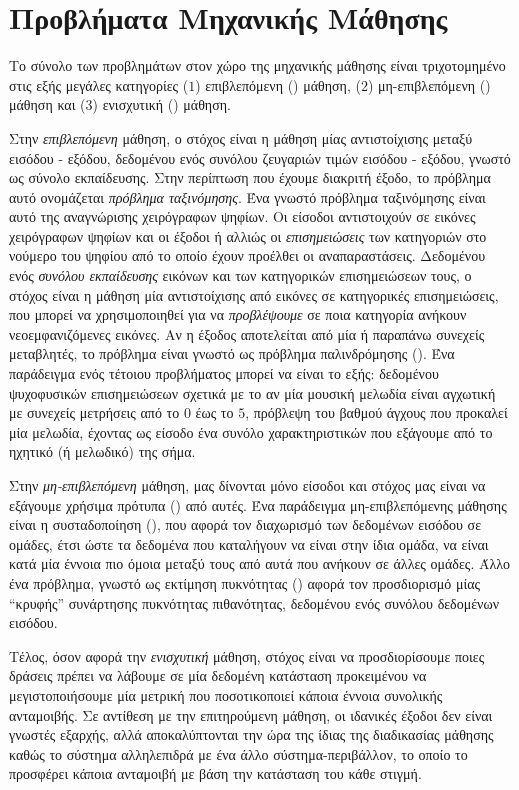 \section{Προβλήματα Μηχανικής Μάθησης}
Το σύνολο των προβλημάτων στον χώρο της μηχανικής μάθησης είναι τριχοτομημένο στις εξής μεγάλες κατηγορίες ($1$) επιβλεπόμενη () μάθηση, ($2$) μη-επιβλεπόμενη () μάθηση και ($3$) ενισχυτική () μάθηση.\par
Στην \textit{επιβλεπόμενη} μάθηση, ο στόχος είναι η μάθηση μίας αντιστοίχισης μεταξύ εισόδου - εξόδου, δεδομένου ενός συνόλου ζευγαριών τιμών εισόδου - εξόδου, γνωστό ως σύνολο εκπαίδευσης.
Στην περίπτωση που έχουμε διακριτή έξοδο, το πρόβλημα αυτό ονομάζεται \textit{πρόβλημα ταξινόμησης}.
Ένα γνωστό πρόβλημα ταξινόμησης είναι αυτό της αναγνώρισης χειρόγραφων ψηφίων.
Οι είσοδοι αντιστοιχούν σε εικόνες χειρόγραφων ψηφίων και οι έξοδοι ή αλλιώς οι \textit{επισημειώσεις} των κατηγοριών στο νούμερο του ψηφίου από το οποίο έχουν προέλθει οι αναπαραστάσεις.
Δεδομένου ενός \textit{συνόλου εκπαίδευσης} εικόνων και των κατηγορικών επισημειώσεων τους, ο στόχος είναι η μάθηση μία αντιστοίχισης από εικόνες σε κατηγορικές επισημειώσεις, που μπορεί να χρησιμοποιηθεί για να \textit{προβλέψουμε} σε ποια κατηγορία ανήκουν νεοεμφανιζόμενες εικόνες.
Αν η έξοδος αποτελείται από μία ή παραπάνω συνεχείς μεταβλητές, το πρόβλημα είναι γνωστό ως πρόβλημα παλινδρόμησης ().
Ένα παράδειγμα ενός τέτοιου προβλήματος μπορεί να είναι το εξής: δεδομένου ψυχοφυσικών επισημειώσεων σχετικά με το αν μία μουσική μελωδία είναι αγχωτική με συνεχείς μετρήσεις από το $0$ έως το $5$, πρόβλεψη του βαθμού άγχους που προκαλεί μία μελωδία, έχοντας ως είσοδο ένα συνόλο χαρακτηριστικών που εξάγουμε από το ηχητικό (ή μελωδικό) της σήμα.\par
Στην \textit{μη-επιβλεπόμενη} μάθηση, μας δίνονται μόνο είσοδοι και στόχος μας είναι να εξάγουμε χρήσιμα πρότυπα () από αυτές.
Ένα παράδειγμα μη-επιβλεπόμενης μάθησης είναι η συσταδοποίηση (), που αφορά τον διαχωρισμό των δεδομένων εισόδου σε ομάδες, έτσι ώστε τα δεδομένα που καταλήγουν να είναι στην ίδια ομάδα, να είναι κατά μία έννοια πιο όμοια μεταξύ τους από αυτά που ανήκουν σε άλλες ομάδες.
Άλλο ένα πρόβλημα, γνωστό ως εκτίμηση πυκνότητας () αφορά τον προσδιορισμό μίας ``κρυφής'' συνάρτησης πυκνότητας πιθανότητας, δεδομένου ενός συνόλου δεδομένων εισόδου.\par
Τέλος, όσον αφορά την \textit{ενισχυτική} μάθηση, στόχος είναι να προσδιορίσουμε ποιες δράσεις πρέπει να λάβουμε σε μία δεδομένη κατάσταση προκειμένου να μεγιστοποιήσουμε μία μετρική που ποσοτικοποιεί κάποια έννοια συνολικής ανταμοιβής.
Σε αντίθεση με την επιτηρούμενη μάθηση, οι ιδανικές έξοδοι δεν είναι γνωστές εξαρχής, αλλά αποκαλύπτονται την ώρα της ίδιας της διαδικασίας μάθησης καθώς το σύστημα αλληλεπιδρά με ένα άλλο σύστημα-περιβάλλον, το οποίο το προσφέρει κάποια ανταμοιβή με βάση την κατάσταση του κάθε στιγμή.
